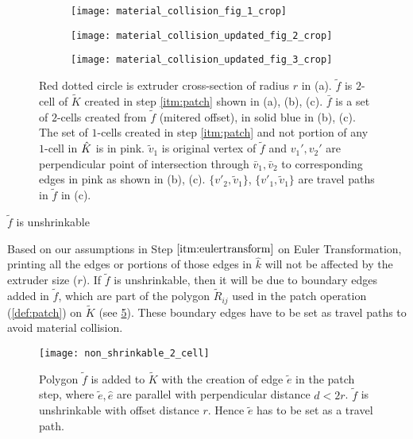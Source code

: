   \begin{figure}[ht!]
	\centering
	\begin{subfigure}[t]{1.4in}
		\centering
		\texttt{[image: material\_collision\_fig\_1\_crop]}
		\caption{\label{fig:matcola}}
	\end{subfigure}
	\hspace*{.5in}
	\begin{subfigure}[t]{1.4in}
		\centering
		\texttt{[image: material\_collision\_updated\_fig\_2\_crop]}
		\caption{\label{fig:matcolb}}
	\end{subfigure}
	\hspace*{.5in}
	\begin{subfigure}[t]{1.4in}
		\centering
		\texttt{[image: material\_collision\_updated\_fig\_3\_crop]}
		\caption{\label{fig:matcolc}}		
	\end{subfigure}
	\caption{\label{fig:matcol}
		Red dotted circle is extruder cross-section of radius $r$ in (a).
		$\tilde{f}$ is $2$-cell of $\tilde{K}$ created in step \ref{itm:patch} shown in (a), (b), (c).
		$\bar{f}$ is a set of $2$-cells created from $\tilde{f}$ (mitered offset), in solid blue in (b), (c).
		The set of $1$-cells created in step \ref{itm:patch} and not portion of any $1$-cell in $\hat{K}$ is in pink.
		$\tilde{v}_1$ is original vertex of $\tilde{f}$ and $v_1', v_2'$ are perpendicular point of intersection through $\bar{v}_1, \bar{v}_2$ to corresponding edges in pink as shown in (b), (c).
		$\{v'_2, \tilde{v}_1\}$, $\{v'_1, \tilde{v}_1\}$ are travel paths in $\tilde{f}$ in (c).
	}
\end{figure}

   \begin{case}
 	$\tilde{f}$ is unshrinkable
 \end{case} 
   Based on our assumptions in Step $\ref{itm:eulertransform}$ on Euler Transformation, printing all the edges or portions of those edges in $\hat{k}$ will not be affected by the extruder size ($r$).
   If $\tilde{f}$ is unshrinkable, then it will be due to boundary edges added in $\tilde{f}$, which are part of the polygon $\tilde{R}_{ij}$ used in the patch operation (\cref{def:patch}) on $\tilde{K}$ (see \cref{fig:unshrinkable}).
   These boundary edges have to be set as travel paths to avoid material collision. 
  
   \begin{figure}[htp!] 
     \centering
     \texttt{[image: non\_shrinkable\_2\_cell]}
     \caption{\label{fig:unshrinkable}
       Polygon $\tilde{f}$ is added to $\tilde{K}$ with the creation of edge $\tilde{e}$ in the patch step, where $\tilde{e}, \hat{e}$ are parallel with perpendicular distance $d < 2r$.
       $\tilde{f}$ is unshrinkable with offset distance $r$.
       Hence $\tilde{e}$ has to be set as a travel path.
     }
   \end{figure}

